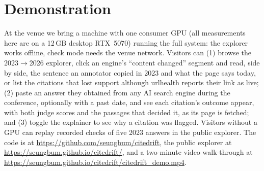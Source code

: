 \section{Demonstration}
\label{sec:demo}
At the venue we bring a machine with one consumer GPU (all measurements here are on a 12\,GB desktop RTX~5070) running the full system: the explorer works offline, check mode needs the venue network. Visitors can (1) browse the 2023$\rightarrow$2026 explorer, click an engine's ``content changed'' segment and read, side by side, the sentence an annotator copied in 2023 and what the page says today, or list the \uhLiveLost citations that lost support although urlhealth reports their link as live; (2) paste an answer they obtained from any AI search engine during the conference, optionally with a past date, and see each citation's outcome appear, with both judge scores and the passages that decided it, as its page is fetched; and (3) toggle the explainer to see why a citation was flagged. Visitors without a GPU can replay recorded checks of five 2023 answers in the public explorer. The code is at \url{https://github.com/seungbum/citedrift}, the public explorer at \url{https://seungbum.github.io/citedrift/}, and a two-minute video walk-through at \url{https://seungbum.github.io/citedrift/citedrift_demo.mp4}.
